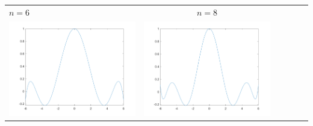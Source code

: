 \begin{tabular}{l*{5}{c}}
\hspace{3.5cm}\(n=6\)& \(n=8\) \\
\includegraphics[scale=0.5]{cap4/4_7/6.png} &  \includegraphics[scale=0.5]{cap4/4_7/8.png} \\


\end{tabular}
